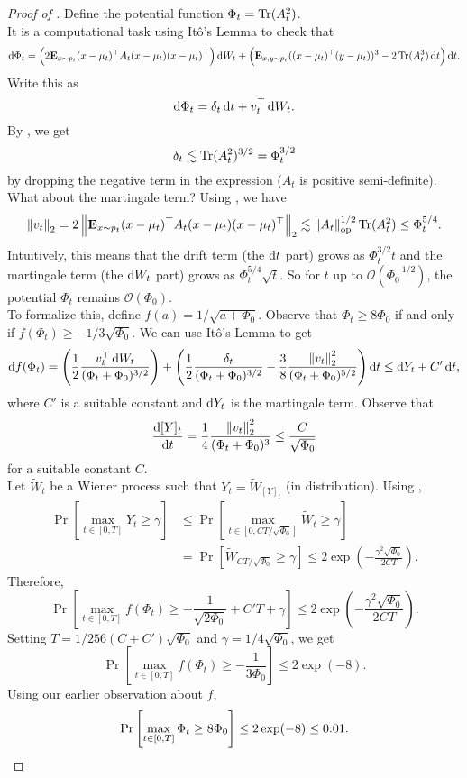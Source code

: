 \documentclass{article}
\begin{document}
		\begin{proof}[Proof of ]
			Define the potential function $\Phi_t = \operatorname{Tr}(A_t^2)$.\\
			It is a computational task using It\^{o}'s Lemma to check that
			\[ \operatorname{d}\!{\Phi_t} = \left( 2 \textbf{E}_{x \sim p_t} (x-\mu_t)^\top A_t (x-\mu_t)(x-\mu_t)^\top \right) \operatorname{d}\!{W}_t + \left( \textbf{E}_{x,y \sim p_t} ((x-\mu_t)^\top(y-\mu_t))^3 - 2 \operatorname{Tr}(A_t^3)\operatorname{d}\!{t} \right) \operatorname{d}\!{t}. \]
			Write this as
			\[ \operatorname{d}\!{\Phi_t} = \delta_t \operatorname{d}\!{t} + v_t^\top \operatorname{d}\!{W}_t. \]
			By , we get
			\[ \delta_t \lesssim \operatorname{Tr}(A_t^2)^{3/2} = \Phi_t^{3/2} \]
			by dropping the negative term in the expression ($A_t$ is positive semi-definite). What about the martingale term? Using , we have
			\[ \left\lVert v_t\right\rVert_2 = 2 \left\lVert\textbf{E}_{x \sim p_t} (x-\mu_t)^\top A_t (x-\mu_t)(x-\mu_t)^\top\right\rVert_2 \lesssim \left\lVert A_t\right\rVert_{\text{op}}^{1/2} \operatorname{Tr}(A_t^2) \leq \Phi_t^{5/4}. \]
			Intuitively, this means that the drift term (the $\operatorname{d}\!{t}$ part) grows as $\Phi_t^{3/2}t$ and the martingale term (the $\operatorname{d}\!{W}_t$ part) grows as $\Phi_t^{5/4}\sqrt{t}$. So for $t$ up to $\mathcal{O}(\Phi_0^{-1/2})$, the potential $\Phi_t$ remains $\mathcal{O}(\Phi_0)$.\\
			To formalize this, define $f(a) = 1/\sqrt{a + \Phi_0}$. Observe that $\Phi_t \geq 8 \Phi_0$ if and only if $f(\Phi_t) \geq -1/3\sqrt{\Phi_0}$. We can use It\^{o}'s Lemma to get
			\[ \operatorname{d}\!{f(\Phi_t)} = \left(\frac{1}{2} \frac{v_t^\top \operatorname{d}\!{W}_t}{(\Phi_t + \Phi_0)^{3/2}} \right) + \left(\frac{1}{2}\frac{\delta_t}{(\Phi_t+\Phi_0)^{3/2}} - \frac{3}{8}\frac{\left\lVert v_t\right\rVert_2^2}{(\Phi_t + \Phi_0)^{5/2}}\right)\operatorname{d}\!{t} \leq \operatorname{d}\!{Y_t} + C' \operatorname{d}\!{t}, \]
			where $C'$ is a suitable constant and $\operatorname{d}\!{Y_t}$ is the martingale term. Observe that
			\[ \frac{\operatorname{d}\!{[Y]_t}}{\operatorname{d}\!{t}} = \frac{1}{4} \frac{\left\lVert v_t\right\rVert_2^2}{(\Phi_t + \Phi_0)^3} \leq \frac{C}{\sqrt{\Phi_0}} \]
			for a suitable constant $C$.\\
			Let $\tilde{W}_t$ be a Wiener process such that $Y_t = \tilde{W}_{[Y]_t}$ (in distribution). Using ,
			\begin{align*}
				\Pr\left[\max_{t\in[0,T]} Y_t \geq \gamma\right] &\leq \Pr\left[\max_{t\in\left[0,CT/\sqrt{\Phi_0}\right]} \tilde{W}_t \geq \gamma \right] \\
					&= \Pr\left[\tilde{W}_{CT/\sqrt{\Phi_0}} \geq \gamma\right] \leq 2 \exp\left(-\frac{\gamma^2\sqrt{\Phi_0}}{2CT}\right).
			\end{align*}
			Therefore,
			\[ \Pr\left[\max_{t\in[0,T]}f(\Phi_t) \geq -\frac{1}{\sqrt{2\Phi_0}} + C'T + \gamma\right] \leq 2\exp\left(-\frac{\gamma^2\sqrt{\Phi_0}}{2CT}\right). \]
			Setting $T = 1/256(C+C')\sqrt{\Phi_0}$ and $\gamma = 1/4\sqrt{\Phi_0}$, we get
			\[ \Pr\left[\max_{t\in[0,T]} f(\Phi_t) \geq -\frac{1}{3\Phi_0}\right] \leq 2\exp(-8). \]
			Using our earlier observation about $f$,
			\[ \Pr\left[\max_{t\in[0,T]} \Phi_t \geq 8\Phi_0 \right] \leq 2\exp(-8) \leq 0.01. \qedhere \]
		\end{proof}
\end{document}
